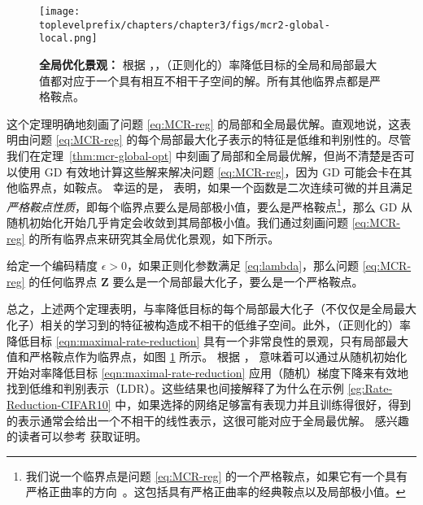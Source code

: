 \documentclass[../../book-main_zh.tex]{subfiles}
\begin{document}
\begin{figure}[t]
	\centering
	\texttt{[image: \\toplevelprefix/chapters/chapter3/figs/mcr2-global-local.png]}
	\caption{{\bf 全局优化景观：} 根据 \cite{sun2015nonconvex,lee2016gradient}，，（正则化的）率降低目标的全局和局部最大值都对应于一个具有相互不相干子空间的解。所有其他临界点都是严格鞍点。}
	\label{fig:mcr-global-local}
\end{figure}

这个定理明确地刻画了问题 \eqref{eq:MCR-reg} 的局部和全局最优解。直观地说，这表明由问题 \eqref{eq:MCR-reg} 的每个局部最大化子表示的特征是低维和判别性的。尽管我们在定理~\ref{thm:mcr-global-opt} 中刻画了局部和全局最优解，但尚不清楚是否可以使用 GD 有效地计算这些解来解决问题 \eqref{eq:MCR-reg}，因为 GD 可能会卡在其他临界点，如鞍点。
幸运的是，\cite{sun2015nonconvex,lee2016gradient} 表明，如果一个函数是二次连续可微的并且满足{\em 严格鞍点性质}，即每个临界点要么是局部极小值，要么是严格鞍点\footnote{我们说一个临界点是问题 \eqref{eq:MCR-reg} 的一个严格鞍点，如果它有一个具有严格正曲率的方向~\cite{sun2015nonconvex}。这包括具有严格正曲率的经典鞍点以及局部极小值。}，那么 GD 从随机初始化开始几乎肯定会收敛到其局部极小值。我们通过刻画问题 \eqref{eq:MCR-reg} 的所有临界点来研究其全局优化景观，如下所示。

 \begin{theorem}[\bf 良性全局优化景观]\label{thm:mcr-benign-opt-landscape}
	给定一个编码精度 $\epsilon > 0$，如果正则化参数满足 \eqref{eq:lambda}，那么问题 \eqref{eq:MCR-reg} 的任何临界点 $\bm Z$ 要么是一个局部最大化子，要么是一个严格鞍点。
\end{theorem}
总之，上述两个定理表明，与率降低目标的每个局部最大化子（不仅仅是全局最大化子）相关的学习到的特征被构造成不相干的低维子空间。此外，（正则化的）率降低目标 \eqref{eqn:maximal-rate-reduction} 具有一个非常良性的景观，只有局部最大值和严格鞍点作为临界点，如图 \ref{fig:mcr-global-local} 所示。
根据 \cite{sun2015nonconvex,lee2016gradient}， 意味着可以通过从随机初始化开始对率降低目标 \eqref{eqn:maximal-rate-reduction} 应用（随机）梯度下降来有效地找到低维和判别表示（LDR）。这些结果也间接解释了为什么在示例 \ref{eg:Rate-Reduction-CIFAR10} 中，如果选择的网络足够富有表现力并且训练得很好，得到的表示通常会给出一个不相干的线性表示，这很可能对应于全局最优解。
感兴趣的读者可以参考 \cite{wang2024global} 获取证明。
\end{document}
